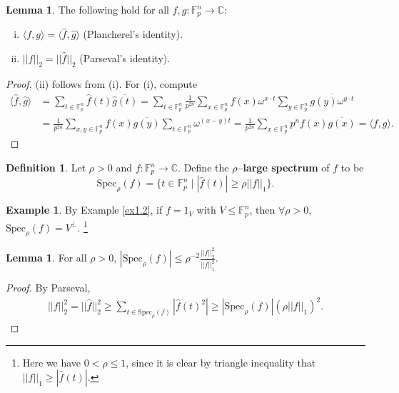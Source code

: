 \documentclass{article}
\theoremstyle{definition}
\newtheorem{lemma}[theorem]{Lemma}
\newtheorem{example}[theorem]{Example}
\newtheorem{defn}[theorem]{Definition}
\begin{document}
\begin{lemma}\label{lemma1.5}
    The following hold for all $f, g : \mathbb{F}_{p}^n \to \mathbb{C}$:
    \begin{enumerate}[(i)]
        \item $\langle f,g \rangle = \langle \hat{f}, \hat{g} \rangle$ (Plancherel's identity).
        \item $||f||_2 = ||\hat{f}||_2$ (Parseval's identity).
    \end{enumerate}
\end{lemma}
\begin{proof}
    (ii) follows from (i). For (i), compute
    \begin{align*}
        \langle \hat{f},\hat{g} \rangle &= \sum_{t \in \mathbb{F}_{p}^n}^{} \hat{f}(t)\overline{\hat{g}(t)} = \sum_{t \in \mathbb{F}_{p}^n}^{} \frac{1}{p^{2n}}\sum_{x \in \mathbb{F}_{p}^n}^{} f(x) \omega^{x \cdot t} \sum_{y \in \mathbb{F}_{p}^n}^{} \overline{g(y) \omega^{y\cdot t}}  \\
        &= \frac{1}{p^{2n}}\sum_{x,y \in \mathbb{F}_{p}^n}^{}  f(x)\overline{g(y)}\sum_{t \in \mathbb{F}_{p}^n}^{} \omega^{(x-y)t} = \frac{1}{p^{2n}}\sum_{x \in \mathbb{F}_{p}^n}^{} p^n f(x)\overline{g(x)} = \langle f,g \rangle.
    \end{align*}
    
\end{proof}
\begin{defn}\label{defn1.6}
    Let $\rho > 0$ and $f : \mathbb{F}_{p}^n \to \mathbb{C}$. Define the \textbf{$\rho$--large spectrum} of $f$ to be
    \[
    \text{Spec}_{\rho}(f) = \{t \in \mathbb{F}_{p}^n \mid |\hat{f}(t)| \ge \rho ||f||_1\}.
    \]
\end{defn}
\begin{example}
    By Example \ref{ex1.2}, if $f = 1_V$ with $V \le \mathbb{F}_{p}^n$, then $\forall \rho >0$, $\text{Spec}_{\rho}(f) = V^\perp$. \footnote{Here we have $0<\rho \le 1$, since it is clear by triangle inequality that $||f||_1 \ge |\hat{f}(t)|$.} 
\end{example}
\begin{lemma}\label{lemma1.8}
    For all $\rho > 0$, $|\text{Spec}_{\rho}(f)| \le \rho^{-2}\frac{||f||_2^2}{||f||_1^2}$.
\end{lemma}
\begin{proof}
    By Parseval,
    \begin{align*}
        ||f||_2^2 = ||\hat{f}||_2^2\ge \sum_{t \in \text{Spec}_{\rho}(f)}^{} |\hat{f}(t)^2| \ge |\text{Spec}_{\rho}(f)|(\rho ||f||_1)^2.
    \end{align*}
\end{proof}
\end{document}
